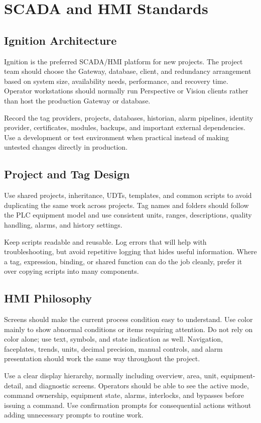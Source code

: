 \chapter{SCADA and HMI Standards}
\section{Ignition Architecture}
Ignition is the preferred SCADA/HMI platform for new projects. The project team should choose the Gateway, database, client, and redundancy arrangement based on system size, availability needs, performance, and recovery time. Operator workstations should normally run Perspective or Vision clients rather than host the production Gateway or database.

Record the tag providers, projects, databases, historian, alarm pipelines, identity provider, certificates, modules, backups, and important external dependencies. Use a development or test environment when practical instead of making untested changes directly in production.

\section{Project and Tag Design}
Use shared projects, inheritance, UDTs, templates, and common scripts to avoid duplicating the same work across projects. Tag names and folders should follow the PLC equipment model and use consistent units, ranges, descriptions, quality handling, alarms, and history settings.

Keep scripts readable and reusable. Log errors that will help with troubleshooting, but avoid repetitive logging that hides useful information. Where a tag, expression, binding, or shared function can do the job cleanly, prefer it over copying scripts into many components.

\section{HMI Philosophy}
Screens should make the current process condition easy to understand. Use color mainly to show abnormal conditions or items requiring attention. Do not rely on color alone; use text, symbols, and state indication as well. Navigation, faceplates, trends, units, decimal precision, manual controls, and alarm presentation should work the same way throughout the project.

Use a clear display hierarchy, normally including overview, area, unit, equipment-detail, and diagnostic screens. Operators should be able to see the active mode, command ownership, equipment state, alarms, interlocks, and bypasses before issuing a command. Use confirmation prompts for consequential actions without adding unnecessary prompts to routine work.

